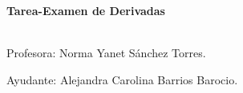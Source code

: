 \documentclass {article}
\title{}
\author{}
\begin{document}
\begin{center}
{\LARGE \bf  Tarea-Examen de Derivadas}\\

\

Profesora: Norma Yanet S\'anchez Torres.

Ayudante: Alejandra Carolina Barrios Barocio.\\

\

\end{center}
\end{document}
